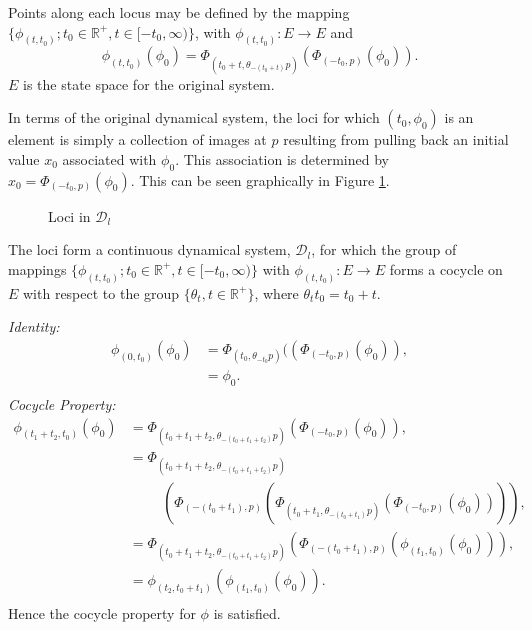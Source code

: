 Points along each locus may be defined by the mapping $\{
\phi_{(t, t_0)}; t_0 \in \mathbb{R}^+, t \in [-t_0, \infty) \}$, with $\phi_{(t,
t_0)}: E \to E$ and
\[ \phi_{(t , t_0)}(\phi_0) = \Phi_{(t_0 + t, \theta_{-(t_0+t)}p)}
   (\Phi_{(-t_0, p)}(\phi_0)). \]
$E$ is the state space for the original system.

In terms of the original dynamical system, the loci for which
$(t_0, \phi_0)$ is an element is simply a collection of images at $p$
resulting from pulling back an initial value $x_0$ associated with
$\phi_0$. This association is determined by
$x_0 = \Phi_{(-t_0, p)}(\phi_0)$.  This can be seen graphically in Figure
\ref{loci3}.

\begin{figure}[htb]
\begin{center}
 \caption{Loci in $\mathcal{D}_l$}
\protect\label{loci3}
\end{center}
\end{figure}

\begin{lemma}\label{lemDlconst}
The loci form a continuous dynamical system, $\mathcal{D}_l$, for which the
group of mappings $\{ \phi_{(t,t_0)}; t_0 \in \mathbb{R}^+, t \in [-t_0, \infty)
\}$ with $\phi_{(t,t_0)}: E \to E$ forms a cocycle on $E$ with respect to the
group $\{\theta_t, t \in \mathbb{R}^+ \}$, where $\theta_{t}t_0 = t_0 + t$.
\end{lemma}
\begin{prf}
{\em Identity:}
\begin{align*}
  \phi_{(0,t_0)}(\phi_0) &=  \Phi_{(t_0, \theta_{-t_0}p)}((\Phi_{(-t_0, p)}
              (\phi_0)), \\
  &= \phi_0. \\
\end{align*}
{\em Cocycle Property:}
\begin{align*}
  \phi_{(t_1+t_2, t_0)}(\phi_0) &= \Phi_{(t_0+t_1+t_2,
        \theta_{-(t_0+t_1+t_2)}p)}(\Phi_{(-t_0, p)}(\phi_0)), \\
  &= \Phi_{(t_0+t_1+t_2,
        \theta_{-(t_0+t_1+t_2)}p)} \\
  & \hspace{1cm} \left(\Phi_{(-(t_0+t_1), p)}(
        \Phi_{(t_0+t_1, \theta_{-(t_0+t_1)}p)}( \Phi_{(-t_0, p)}(\phi_0) )
        )\right), \\
  &= \Phi_{(t_0+t_1+t_2,
        \theta_{-(t_0+t_1+t_2)}p)}\left(\Phi_{(-(t_0+t_1), p)}(
        \phi_{(t_1, t_0)}(\phi_0)) \right), \\
  &= \phi_{(t_2,t_0+t_1)}(\phi_{(t_1,t_0)}(\phi_0)). \\
\end{align*}
Hence the cocycle property for $\phi$ is satisfied.
\end{prf}

